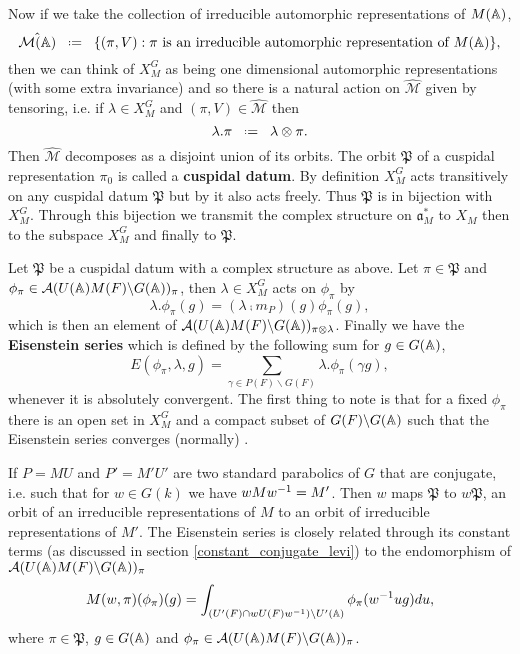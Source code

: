 Now if we take the collection of irreducible automorphic representations of \(M(\A)\),
 \[\hat{\mathcal{M}(\A)} \defeq \{(\pi, V) : \pi \text{ is an irreducible automorphic representation of }M(\A)\},\]
then we can think of \(X_M^G\) as being one dimensional automorphic representations (with some extra invariance) and so there is a natural action on \(\hat{\mathcal{M}}\) given by tensoring, i.e. if \(\lambda\in X_M^G\) and \((\pi, V)\in \hat{\mathcal{M}}\) then 
\[\lambda.\pi \defeq \lambda\tensor \pi.\]
Then \(\hat{\mathcal{M}}\) decomposes as a disjoint union of its orbits. The orbit \(\mathfrak{P}\) of a cuspidal representation \(\pi_0\) is called a \textbf{cuspidal datum}. By definition \(X_M^G\) acts transitively on any cuspidal datum \(\mathfrak{P}\) but by \cite[II.1]{moeglinSpectralDecompositionEisenstein1995} it also acts freely. Thus \(\mathfrak{P}\) is in bijection with \(X_M^G\). Through this bijection we transmit the complex structure on \(\mathfrak{a}_M^*\) to \(X_M\) then to the subspace \(X_M^G\) and finally to \(\mathfrak{P}\).
\label{orbits}

Let \(\mathfrak{P}\) be a cuspidal datum with a complex structure as above. Let \(\pi\in \mathfrak{P}\) and \(\phi_\pi \in \mathcal{A}(U(\A)M(F)\backslash G(\A))_\pi\), then \(\lambda\in X_M^G\) acts on \(\phi_\pi\) by 
\[\lambda.\phi_\pi(g) = (\lambda \comp m_P)(g) \phi_\pi(g),\]
which is then an element of \(\mathcal{A}(U(\A)M(F)\backslash G(\A))_{\pi\tensor \lambda}\). Finally we have the \textbf{Eisenstein series} which is defined by the following sum for \(g\in G(\A)\),
\[E(\phi_\pi, \lambda, g) = \sum_{\gamma \in P(F)\backslash G(F)} \lambda.\phi_\pi(\gamma g),\]
whenever it is absolutely convergent. The first thing to note is that for a fixed \(\phi_\pi\) there is an open set in \(X_M^G\) and a compact subset of \(G(F)\backslash G(\A)\) such that the Eisenstein series converges (normally) \cite[II.1.5]{moeglinSpectralDecompositionEisenstein1995}.

If \(P = MU\) and \(P' = M'U'\) are two standard parabolics of \(G\) that are conjugate, i.e. such that for \(w\in G(k)\) we have \(wMw^{-1} = M'\).
Then \(w\) maps \(\mathfrak{P}\) to \(w\mathfrak{P}\), an orbit of an irreducible representations of \(M\) to an orbit of irreducible representations of \(M'\).
The Eisenstein series is closely related through its constant terms (as discussed in section \ref{constant_conjugate_levi}) to the endomorphism of \(\mathcal{A}(U(\A)M(F)\backslash G(\A))_\pi\) 
\[M(w, \pi)(\phi_\pi)(g) = \int_{(U'(F)\cap wU(F)w\inv )\backslash U'(\A)} \phi_\pi(w\inv ug) du,\]
where \(\pi\in \mathfrak{P}\), \(g\in G(\A)\) and \(\phi_\pi \in \mathcal{A}(U(\A)M(F)\backslash G(\A))_\pi\).

